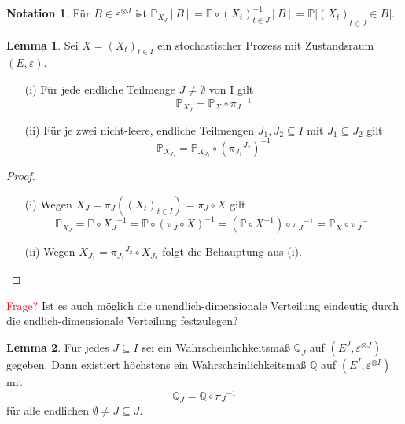 \documentclass[a4paper,12pt]{scrartcl}
\theoremstyle{definition}
\newtheorem{noti}{Notation}[section]
\newtheorem{lemi}{Lemma}[section]
\begin{document}
\begin{noti}
Für $B \in \varepsilon^{ \otimes J}$ ist ${{\mathbb{P}}_{X_{J}}}[B] = {\mathbb{P} \circ {{(X_{t})}}_{t\in J}^{-1}[B] = \mathbb{P}[(X_{t})}_{t\in J} \in B]$. 
\end{noti}
\clearpairofpagestyles
\ihead{\headmark}
\ohead{\pagemark}
\pagestyle{scrheadings}
\begin{lemi}
\label{Teilmengen Lemma}
Sei $X = {(X_{t})}_{t\in I}$ ein stochastischer Prozess mit Zustandsraum $(E,\varepsilon)$.
\begin{itemize}
\item[(i)] Für jede endliche Teilmenge $J \neq \emptyset$ von I gilt
\begin{equation*}
{{\mathbb{P}}_{X_{J}}} = {\mathbb{P}}_{X} \circ {\pi_{J}}^{-1}
\end{equation*}
\item[(ii)] Für je zwei nicht-leere, endliche Teilmengen $J_{1},J_{2} \subseteq I$ mit $J_{1} \subseteq J_{2}$ gilt
\begin{equation*}
{{\mathbb{P}}_{X_{J_{1}}}} = {\mathbb{P}}_{X_{J_{2}}} \circ {({\pi_{J_{1}}}^{J_{2}})}^{-1}
\end{equation*}
\end{itemize}
\end{lemi}
\begin{proof}                                                                                                  
\mbox{}
\begin{itemize}
\item[(i)] Wegen $X_{J} = \pi_{J}({(X_{t})}_{t\in I}) = \pi_{J} \circ X$ gilt 
\begin{equation*}
{\mathbb{P}}_{X_{J}} = \mathbb{P} \circ {X_{J}}^{-1} = \mathbb{P} \circ {(\pi_{J} \circ X)}^{-1} = (\mathbb{P} \circ X^{-1}) \circ {\pi_{J}}^{-1} = \mathbb{P}_{X} \circ {\pi_{J}}^{-1} 
\end{equation*}

\item[(ii)] Wegen $X_{J_{1}} = {\pi_{J_{1}}}^{J_{2}} \circ X_{J_{2}}$ folgt die Behauptung aus (i).

\end{itemize}
\end{proof}
\noindent
\textcolor{red}{Frage?} Ist es auch möglich die unendlich-dimensionale Verteilung eindeutig durch die endlich-dimensionale Verteilung festzulegen?
\begin{lemi}
Für jedes $J \subseteq I$ sei ein Wahrscheinlichkeitsmaß $\mathbb{Q}_{J}$ auf  $(E^{J},\varepsilon^{ \otimes J})$ gegeben. Dann existiert höchstens ein Wahrscheinlichkeitsmaß $\mathbb{Q}$ auf $(E^{I},\varepsilon^{ \otimes I})$ mit
\begin{equation*}
{\mathbb{Q}}_{J} = \mathbb{Q} \circ {\pi_{J}}^{-1} 
\end{equation*}
für alle endlichen $\emptyset \neq J \subseteq J$.
\end{lemi}
\end{document}
